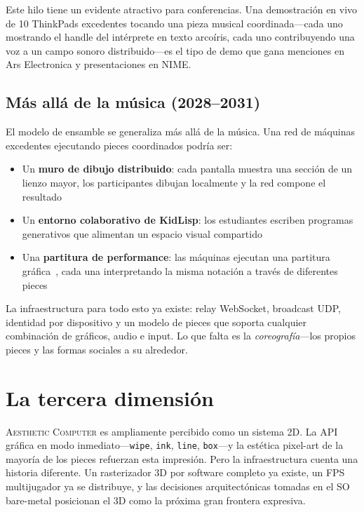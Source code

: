 \documentclass[10pt,letterpaper,twocolumn]{article}
\newcommand{\ac}{\textsc{Aesthetic Computer}}
\begin{document}
Este hilo tiene un evidente atractivo para conferencias. Una demostración en vivo de 10 ThinkPads excedentes tocando una pieza musical coordinada---cada uno mostrando el handle del intérprete en texto arcoíris, cada uno contribuyendo una voz a un campo sonoro distribuido---es el tipo de demo que gana menciones en Ars Electronica y presentaciones en NIME.

\subsection{Más allá de la música (2028--2031)}

El modelo de ensamble se generaliza más allá de la música. Una red de máquinas excedentes ejecutando pieces coordinados podría ser:

\begin{itemize}
  \item Un \textbf{muro de dibujo distribuido}: cada pantalla muestra una sección de un lienzo mayor, los participantes dibujan localmente y la red compone el resultado
  \item Un \textbf{entorno colaborativo de KidLisp}: los estudiantes escriben programas generativos que alimentan un espacio visual compartido
  \item Una \textbf{partitura de performance}: las máquinas ejecutan una partitura gráfica~\citep{scudder2026pieces}, cada una interpretando la misma notación a través de diferentes pieces
\end{itemize}

La infraestructura para todo esto ya existe: relay WebSocket, broadcast UDP, identidad por dispositivo y un modelo de pieces que soporta cualquier combinación de gráficos, audio e input. Lo que falta es la \emph{coreografía}---los propios pieces y las formas sociales a su alrededor.


\section{La tercera dimensión}
\label{sec:3d}

\ac{} es ampliamente percibido como un sistema 2D. La API gráfica en modo inmediato---\texttt{wipe}, \texttt{ink}, \texttt{line}, \texttt{box}---y la estética pixel-art de la mayoría de los pieces refuerzan esta impresión. Pero la infraestructura cuenta una historia diferente. Un rasterizador 3D por software completo ya existe, un FPS multijugador ya se distribuye, y las decisiones arquitectónicas tomadas en el SO bare-metal posicionan el 3D como la próxima gran frontera expresiva.
\end{document}
